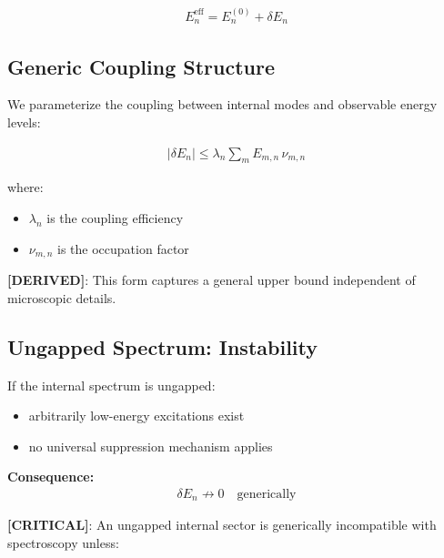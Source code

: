 \documentclass[11pt]{article}
\theoremstyle{definition}
\theoremstyle{plain}
\theoremstyle{remark}
\begin{document}
        \begin{align}
            E_n^{\text{eff}} = E_n^{(0)} + \delta E_n
            \label{eq:effective_energy}
        \end{align}
    
    \subsection{Generic Coupling Structure}
        
        We parameterize the coupling between internal modes and observable energy levels:
        
        \begin{align}
            |\delta E_n| \leq \lambda_n \sum_m E_{m,n} \, \nu_{m,n}
            \label{eq:coupling_bound}
        \end{align}
        
        where:
        \begin{itemize}
            \item $\lambda_n$ is the coupling efficiency
            \item $\nu_{m,n}$ is the occupation factor
        \end{itemize}
        
        \textbf{[DERIVED]}: This form captures a general upper bound independent of microscopic details.
    
    \subsection{Ungapped Spectrum: Instability}
        
        If the internal spectrum is ungapped:
        
        \begin{itemize}
            \item arbitrarily low-energy excitations exist
            \item no universal suppression mechanism applies
        \end{itemize}
        
        \textbf{Consequence:}
        \begin{align}
            \delta E_n \not\to 0 \quad \text{generically}
        \end{align}
        
        \textbf{[CRITICAL]}:
        An ungapped internal sector is generically incompatible with spectroscopy unless:
        
\end{document}
